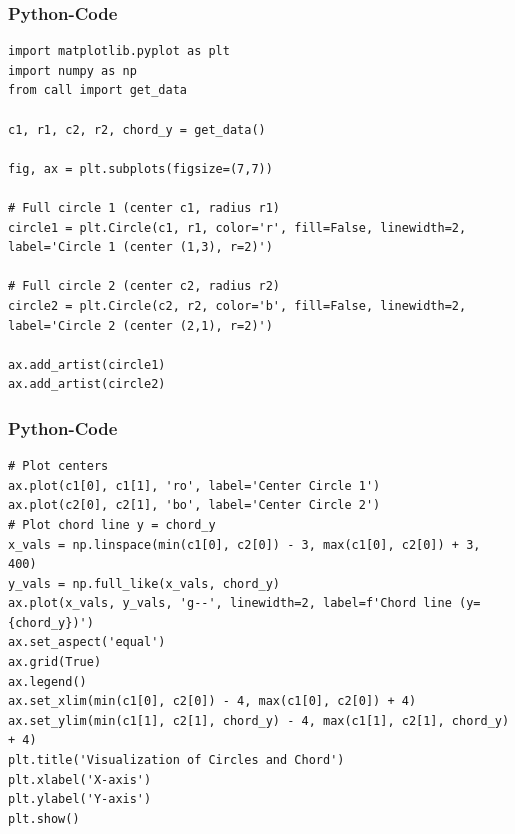 \documentclass{beamer}
\begin{document}
\begin{frame}[fragile]
\frametitle{Python-Code}
\begin{lstlisting}
import matplotlib.pyplot as plt
import numpy as np
from call import get_data

c1, r1, c2, r2, chord_y = get_data()

fig, ax = plt.subplots(figsize=(7,7))

# Full circle 1 (center c1, radius r1)
circle1 = plt.Circle(c1, r1, color='r', fill=False, linewidth=2, label='Circle 1 (center (1,3), r=2)')

# Full circle 2 (center c2, radius r2)
circle2 = plt.Circle(c2, r2, color='b', fill=False, linewidth=2, label='Circle 2 (center (2,1), r=2)')

ax.add_artist(circle1)
ax.add_artist(circle2)
\end{lstlisting}
\end{frame}

\begin{frame}[fragile]
\frametitle{Python-Code}
\begin{lstlisting}
# Plot centers
ax.plot(c1[0], c1[1], 'ro', label='Center Circle 1')
ax.plot(c2[0], c2[1], 'bo', label='Center Circle 2')
# Plot chord line y = chord_y
x_vals = np.linspace(min(c1[0], c2[0]) - 3, max(c1[0], c2[0]) + 3, 400)
y_vals = np.full_like(x_vals, chord_y)
ax.plot(x_vals, y_vals, 'g--', linewidth=2, label=f'Chord line (y={chord_y})')
ax.set_aspect('equal')
ax.grid(True)
ax.legend()
ax.set_xlim(min(c1[0], c2[0]) - 4, max(c1[0], c2[0]) + 4)
ax.set_ylim(min(c1[1], c2[1], chord_y) - 4, max(c1[1], c2[1], chord_y) + 4)
plt.title('Visualization of Circles and Chord')
plt.xlabel('X-axis')
plt.ylabel('Y-axis')
plt.show()
\end{lstlisting}
\end{frame}
\end{document}
